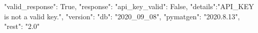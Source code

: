 {"valid_response": True,
"response":
  {"api_key_valid": False,
  "details":"API_KEY is not a valid key.",
  "version":
    {"db": "2020_09_08",
    "pymatgen": "2020.8.13",
    "rest": "2.0"}
  }
}
